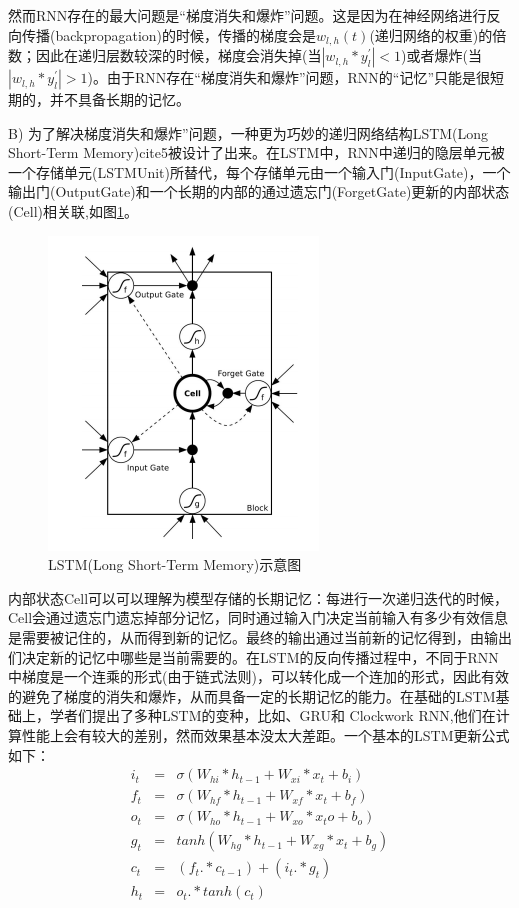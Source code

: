 然而RNN存在的最大问题是“梯度消失和爆炸”问题\cite{6}。这是因为在神经网络进行反向传播(backpropagation)的时候，传播的梯度会是$w_{l,h}(t)$(递归网络的权重)的倍数；因此在递归层数较深的时候，梯度会消失掉(当$|w_{l,h}*y^{'}_{l}|<1$)或者爆炸(当$|w_{l,h}*y^{'}_{l}|>1$)。由于RNN存在“梯度消失和爆炸”问题，RNN的“记忆”只能是很短期的，并不具备长期的记忆。

B) 为了解决梯度消失和爆炸”问题，一种更为巧妙的递归网络结构LSTM(Long Short-Term Memory)cite{5}被设计了出来。在LSTM中，RNN中递归的隐层单元被一个存储单元(LSTMUnit)所替代，每个存储单元由一个输入门(InputGate)，一个输出门(OutputGate)和一个长期的内部的通过遗忘门(ForgetGate)更新的内部状态(Cell)相关联,如图\ref{fig:LSTM}。

\begin{figure}[h]
	\centering
	\includegraphics[width=0.3\linewidth]{"fig/LSTM"}
	\caption{LSTM(Long Short-Term Memory)示意图}
	\label{fig:LSTM}
\end{figure}

内部状态Cell可以可以理解为模型存储的长期记忆：每进行一次递归迭代的时候，Cell会通过遗忘门遗忘掉部分记忆，同时通过输入门决定当前输入有多少有效信息是需要被记住的，从而得到新的记忆。最终的输出通过当前新的记忆得到，由输出们决定新的记忆中哪些是当前需要的。在LSTM的反向传播过程中，不同于RNN中梯度是一个连乘的形式(由于链式法则)，可以转化成一个连加的形式，因此有效的避免了梯度的消失和爆炸，从而具备一定的长期记忆的能力。在基础的LSTM基础上，学者们提出了多种LSTM的变种，比如\cite{10}、GRU\cite{11}和 Clockwork RNN\cite{12},他们在计算性能上会有较大的差别，然而效果基本没太大差距\cite{13,14}。一个基本的LSTM更新公式如下：
\begin{eqnarray}
i_t &=& \sigma(W_{hi} * h_{t-1} + W_{xi} * x_t + b_i)
\\
f_t &=& \sigma(W_{hf} * h_{t-1} + W_{xf} * x_t + b_f)
\\
o_t &=& \sigma(W_{ho} * h_{t-1} + W_{xo} * x_to+ b_o)
\\
g_t &=& tanh(W_{hg} * h_{t-1} + W_{xg} * x_t + b_g)
\\
c_t &=& (f_t .* c_{t-1}) + (i_t .* g_t)
\\
h_t &=& o_t .* tanh(c_t)
\end{eqnarray}

